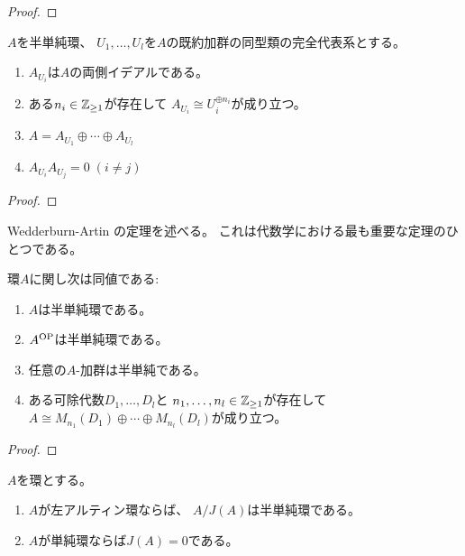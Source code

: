 \documentclass[report]{jlreq}
\begin{document}
\begin{proof}
    \TODO{}
\end{proof}

\begin{theorem}[Wedderburn]
    $A$を半単純環、
    $U_1, \dots, U_l$を$A$の既約加群の同型類の完全代表系とする。
    \begin{enumerate}
        \item $A_{U_i}$は$A$の両側イデアルである。
        \item ある$n_i \in \mathbb{Z}_{\ge 1}$が存在して
            $A_{U_i} \cong U_i^{\oplus n_i}$が成り立つ。
        \item $A = A_{U_1} \oplus \cdots \oplus A_{U_l}$
        \item $A_{U_i} A_{U_j} = 0 \; (i \neq j)$
    \end{enumerate}
\end{theorem}

\begin{proof}
    \TODO{}
\end{proof}

Wedderburn-Artin の定理を述べる。
これは代数学における最も重要な定理のひとつである\cite[p.153]{AF92}。

\begin{theorem}
    環$A$に関し次は同値である:
    \begin{enumerate}
        \item $A$は半単純環である。
        \item $A^{\mathrm{OP}}$は半単純環である。
        \item 任意の$A$-加群は半単純である。
        \item ある可除代数$D_1, \dots, D_l$と
            $n_1, \dots, n_l \in \mathbb{Z}_{\ge 1}$が存在して
            $A \cong M_{n_1}(D_1) \oplus \cdots \oplus M_{n_l}(D_l)$が成り立つ。
    \end{enumerate}
\end{theorem}

\begin{proof}
    \TODO{}
\end{proof}

\begin{theorem}
    $A$を環とする。
    \begin{enumerate}
        \item $A$が左アルティン環ならば、
            $A / J(A)$は半単純環である。
        \item $A$が単純環ならば$J(A) = 0$である。
    \end{enumerate}
\end{theorem}
\end{document}
